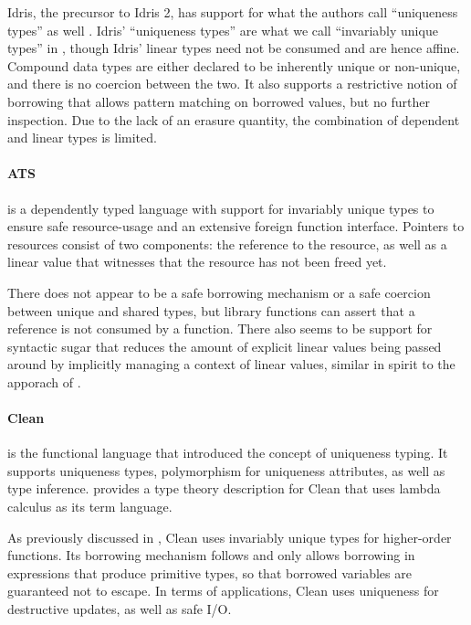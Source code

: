 Idris, the precursor to Idris 2, has support for what the authors call ``uniqueness types'' as well \citep{brady_type-driven_2017}. Idris' ``uniqueness types'' are what we call ``invariably unique types'' in , though Idris' linear types need not be consumed and are hence affine. Compound data types are either declared to be inherently unique or non-unique, and there is no coercion between the two. It also supports a restrictive notion of borrowing that allows pattern matching on borrowed values, but no further inspection. Due to the lack of an erasure quantity, the combination of dependent and linear types is limited.

\paragraph{ATS \citep{shi_linear_2013}} is a dependently typed language with support for invariably unique types to ensure safe resource-usage and an extensive foreign function interface. Pointers to resources consist of two components: the reference to the resource, as well as a linear value that witnesses that the resource has not been freed yet. 

There does not appear to be a safe borrowing mechanism or a safe coercion between unique and shared types, but library functions can assert that a reference is not consumed by a function. There also seems to be support for syntactic sugar that reduces the amount of explicit linear values being passed around by implicitly managing a context of linear values, similar in spirit to the apporach of \cite{spiwack_linearly_2022}.

\paragraph{Clean \citep{smetsers_guaranteeing_1994}} is the functional language that introduced the concept of uniqueness typing. It supports uniqueness types, polymorphism for uniqueness attributes, as well as type inference. \cite{de_vries_making_2009} provides a type theory description for Clean that uses lambda calculus as its term language. 

As previously discussed in , Clean uses invariably unique types for higher-order functions. Its borrowing mechanism follows \cite{wadler_linear_1990} and only allows borrowing in expressions that produce primitive types, so that borrowed variables are guaranteed not to escape. In terms of applications, Clean uses uniqueness for destructive updates, as well as safe I/O.

